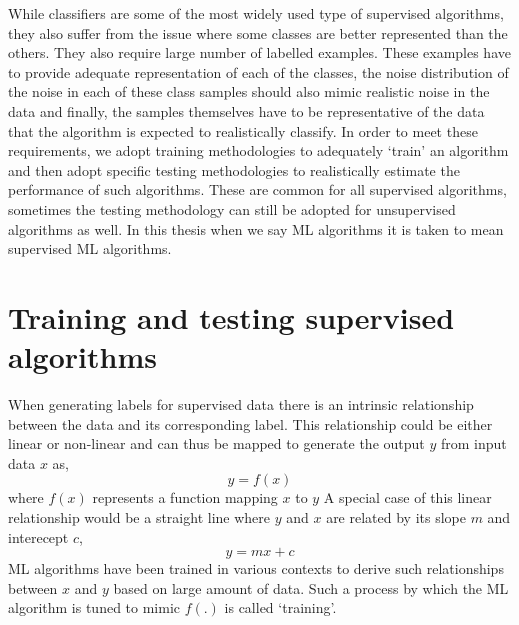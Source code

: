 While classifiers are some of the most widely used type of supervised algorithms, they also suffer from the issue where some classes are better represented than the others. 
They also require large number of labelled examples.
These examples have to provide adequate representation of each of the classes, the noise distribution of the noise in each of these class samples should also mimic realistic noise in the data and finally, the samples themselves have to be representative of the data that the algorithm is expected to realistically classify.
In order to meet these requirements, we adopt training methodologies to adequately `train' an algorithm and then adopt specific testing methodologies to realistically estimate the performance of such algorithms. 
These are common for all supervised algorithms, sometimes the testing methodology can still be adopted for unsupervised algorithms as well.
In this thesis when we say ML algorithms it is taken to mean supervised ML algorithms.
\section{Training and testing supervised algorithms}
When generating labels for supervised data there is an intrinsic relationship between the data and its corresponding label.
This relationship could be either linear or non-linear and can thus be mapped to generate the output $y$ from input data $x$ as,
\begin{equation}
    y = f(x)
    \label{eq:y=fx}
\end{equation}
where $f(x)$ represents a function mapping $x$ to $y$
A special case of this linear relationship would be a straight line where $y$ and $x$ are related by its slope $m$ and interecept $c$,
\begin{equation}
    y =  m x + c
    \label{eq:line}
\end{equation}
ML algorithms have been trained in various contexts to derive such relationships between $x$ and $y$ based on large amount of data.
Such a process by which the ML algorithm is tuned to mimic $f(.)$ is called `training'.

